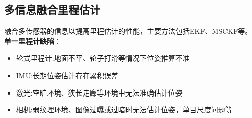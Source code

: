 \documentclass[../main.tex]{subfiles}
\begin{document}
\subsection{多信息融合里程估计}
融合多传感器的信息以提高里程估计的性能，主要方法包括EKF、MSCKF等。
\textbf{单一里程计缺陷}：
\begin{itemize}
    \item 轮式里程计:地面不平、轮子打滑等情况下位姿推算不准
    \item IMU:长期位姿估计存在累积误差
    \item 激光:空旷环境、狭长走廊等环境中无法准确估计位姿
    \item 相机:弱纹理环境、图像过曝或过暗时无法估计位姿，单目尺度问题等
\end{itemize}
\end{document}
